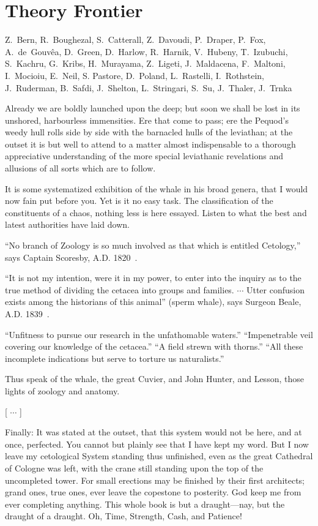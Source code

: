 
\setcounter{chapter}{5} 

\chapter{Theory Frontier}

   {Z.~Bern, R.~Boughezal, S.~Catterall, Z.~Davoudi, P.~Draper, P.~Fox, A.~de~Gouv\^ea,  D.~Green, D.~Harlow,
R.~Harnik, V.~Hubeny,  T.~Izubuchi,
S.~Kachru, G.~Kribs, H.~Murayama, Z.~Ligeti, J.~Maldacena, F.~Maltoni, I.~Mocioiu, E.~Neil, 
S. Pastore, D.~Poland, 
L.~Rastelli, I.~Rothstein, J.~Ruderman, B.~Safdi, J.~Shelton, L.~Stringari, S.~Su, J.~Thaler, J.~Trnka}


Already we are boldly launched upon the deep; but soon we shall be lost in its unshored, harbourless immensities. Ere that come to pass; ere the Pequod’s weedy hull rolls side by side with the barnacled hulls of the leviathan; at the outset it is but well to attend to a matter almost indispensable to a thorough appreciative understanding of the more special leviathanic revelations and allusions of all sorts which are to follow.

It is some systematized exhibition of the whale in his broad genera, that I would now fain put before you. Yet is it no easy task. The classification of the constituents of a chaos, nothing less is here essayed. Listen to what the best and latest authorities have laid down.

``No branch of Zoology is so much involved as that which is entitled Cetology,'' says Captain Scoresby, A.D. 1820~\cite{T-Scoresby}.

``It is not my intention, were it in my power, to enter into the inquiry as to the true method of dividing the cetacea into groups and families. $\cdots$ Utter confusion exists among the historians of this animal'' (sperm whale), says Surgeon Beale, A.D. 1839~\cite{T-Beale}.

``Unfitness to pursue our research in the unfathomable waters.'' ``Impenetrable veil covering our knowledge of the cetacea.''  ``A field strewn with thorns.'' ``All these incomplete indications but serve to torture us naturalists.''

Thus speak of the whale, the great Cuvier, and John Hunter, and Lesson, those lights of zoology and anatomy.

[ $\cdots$ ]

Finally: It was stated at the outset, that this system would not be here, and at once, perfected. You cannot but plainly see that I have kept my word. But I now leave my cetological System standing thus unfinished, even as the great Cathedral of Cologne was left, with the crane still standing upon the top of the uncompleted tower. For small erections may be finished by their first architects; grand ones, true ones, ever leave the copestone to posterity. God keep me from ever completing anything. This whole book is but a draught---nay, but the draught of a draught. Oh, Time, Strength, Cash, and Patience!


